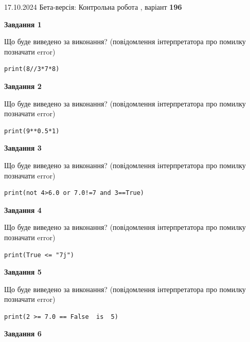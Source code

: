 \documentclass[12pt, ukrainian]{article}
\begin{document}
{\Large{17.10.2024 Бета-версія: Контрольна робота , варіант  \No \textbf { 196 }\par}}
{
\begin {large}
{\begin {center}\textbf{Завдання 1}\end {center}}

Що буде виведено за виконання? (повідомлення інтерпретатора про помилку позначати error)\par
\begin{verbatim}
print(8//3*7*8)
\end{verbatim}

{\begin {center}\textbf{Завдання 2}\end {center}}

Що буде виведено за виконання? (повідомлення інтерпретатора про помилку позначати error)\par
\begin{verbatim}
print(9**0.5*1)
\end{verbatim}

{\begin {center}\textbf{Завдання 3}\end {center}}

Що буде виведено за виконання? (повідомлення інтерпретатора про помилку позначати error)\par
\begin{verbatim}
print(not 4>6.0 or 7.0!=7 and 3==True)
\end{verbatim}

{\begin {center}\textbf{Завдання 4}\end {center}}

Що буде виведено за виконання? (повідомлення інтерпретатора про помилку позначати error)\par
\begin{verbatim}
print(True <= "7j")
\end{verbatim}

{\begin {center}\textbf{Завдання 5}\end {center}}

Що буде виведено за виконання? (повідомлення інтерпретатора про помилку позначати error)\par
\begin{verbatim}
print(2 >= 7.0 == False  is  5)
\end{verbatim}

{\begin {center}\textbf{Завдання 6}\end {center}}


\end{large}}
\end{document}
